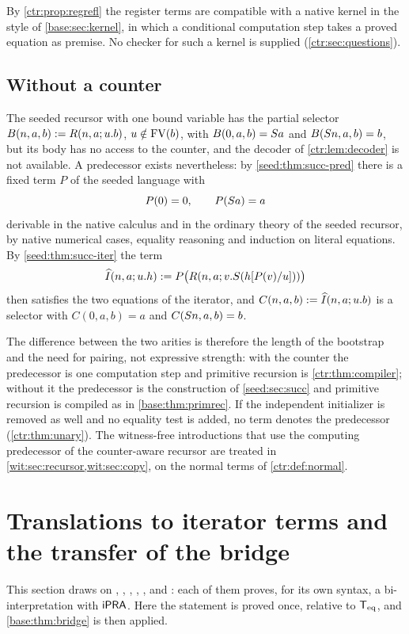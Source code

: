 By \cref{ctr:prop:regrefl} the register terms are compatible with a native kernel in the
style of \cref{base:sec:kernel}, in which a conditional computation step takes a proved
equation as premise. No checker for such a kernel is supplied (\cref{ctr:sec:questions}).

\subsection{Without a counter}

The seeded recursor with one bound variable has the partial selector
$B(n,a,b)\mathrel{:=} R(n,a;u.b)$, $u\notin\operatorname{FV}(b)$, with $B(0,a,b)=S a$ and
$B(S n,a,b)=b$, but its body has no access to the counter, and the decoder of
\cref{ctr:lem:decoder} is not available. A predecessor exists nevertheless: by
\cref{seed:thm:succ-pred} there is a fixed term $P$ of the seeded language with
\begin{equation}\label{ctr:eq:seedpred}
 P(0)=0,\qquad P(S a)=a
\end{equation}
derivable in the native calculus and in the ordinary theory of the seeded recursor, by
native numerical cases, equality reasoning and induction on literal equations. By
\cref{seed:thm:succ-iter} the term
\[
 \widehat I(n,a;u.h)\mathrel{:=} P\bigl(R(n,a;v.S(h[P(v)/u]))\bigr)
\]
then satisfies the two equations of the iterator, and $C(n,a,b)\mathrel{:=}\widehat I(n,a;u.b)$ is
a selector with $C(0,a,b)=a$ and $C(S n,a,b)=b$.

The difference between the two arities is therefore the length of the bootstrap and the
need for pairing, not expressive strength: with the counter the predecessor is one
computation step and primitive recursion is \cref{ctr:thm:compiler}; without it the
predecessor is the construction of \cref{seed:sec:succ} and primitive recursion is compiled
as in \cref{base:thm:primrec}. If the independent initializer is removed as well and no
equality test is added, no term denotes the predecessor (\cref{ctr:thm:unary}). The
witness-free introductions that use the computing predecessor of the counter-aware
recursor are treated in \cref{wit:sec:recursor,wit:sec:copy}, on the normal terms of
\cref{ctr:def:normal}.

\section{Translations to iterator terms and the transfer of the bridge}\label{ctr:sec:bridge}

This section draws on , ,
, , ,
 and : each of them proves, for its own
syntax, a bi-interpretation with $\mathsf{iPRA}$. Here the statement is proved once, relative to
$\mathsf{T}_{\mathrm{eq}}$, and \cref{base:thm:bridge} is then applied.

